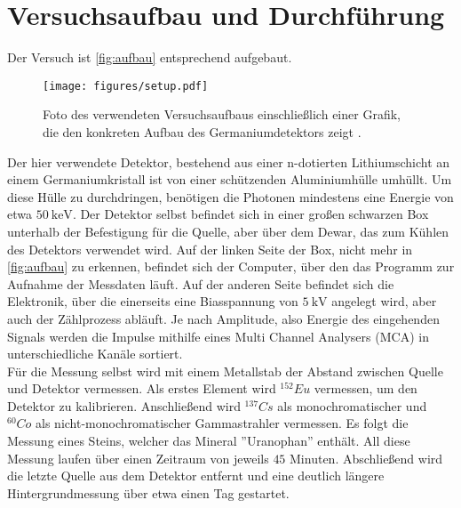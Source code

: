 \section{Versuchsaufbau und Durchführung}
\label{sec:Durchführung}

Der Versuch ist \autoref{fig:aufbau} entsprechend aufgebaut.

\begin{figure}[H]
    \centering
    \texttt{[image: figures/setup.pdf]}
    \caption{Foto des verwendeten Versuchsaufbaus einschließlich einer Grafik, die den konkreten Aufbau des Germaniumdetektors zeigt \cite{v18}.}
    \label{fig:aufbau}
\end{figure}

Der hier verwendete Detektor, bestehend aus einer n-dotierten Lithiumschicht an einem Germaniumkristall ist von einer schützenden Aluminiumhülle umhüllt.
Um diese Hülle zu durchdringen, benötigen die Photonen mindestens eine Energie von etwa $\SI{50}{\kilo\eV}$.
Der Detektor selbst befindet sich in einer großen schwarzen Box unterhalb der Befestigung für die Quelle, aber über dem Dewar,%
das zum Kühlen des Detektors verwendet wird.
Auf der linken Seite der Box, nicht mehr in \autoref{fig:aufbau} zu erkennen, befindet sich der Computer, über den das Programm zur Aufnahme
der Messdaten läuft.
Auf der anderen Seite befindet sich die Elektronik, über die einerseits eine Biasspannung von $\SI{5}{\kilo\volt}$ angelegt wird,
aber auch der Zählprozess abläuft.
Je nach Amplitude, also Energie des eingehenden Signals werden die Impulse mithilfe eines Multi Channel Analysers (MCA) in unterschiedliche
Kanäle sortiert. \\

Für die Messung selbst wird mit einem Metallstab der Abstand zwischen Quelle und Detektor vermessen.
Als erstes Element wird $^{152} Eu$ vermessen, um den Detektor zu kalibrieren.
Anschließend wird $^{137} Cs$ als monochromatischer und $^{60} Co$ als nicht-monochromatischer Gammastrahler vermessen.
Es folgt die Messung eines Steins, welcher das Mineral ''Uranophan'' enthält.  %
All diese Messung laufen über einen Zeitraum von jeweils $45$ Minuten.
Abschließend wird die letzte Quelle aus dem Detektor entfernt und eine deutlich längere Hintergrundmessung über etwa einen Tag gestartet.
